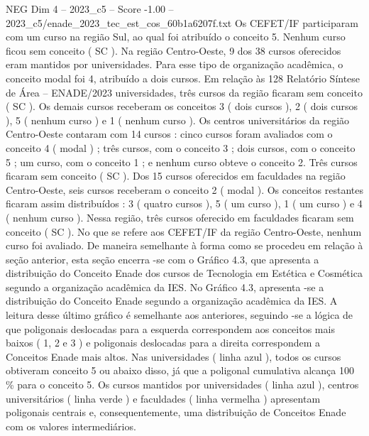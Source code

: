 \begin{textsample}{NEG Dim 4 – 2023\_c5 – Score -1.00 – 2023\_c5/enade\_2023\_tec\_est\_cos\_60b1a6207f.txt}
Os CEFET/IF participaram com um curso na região Sul, ao qual foi atribuído o conceito 5.
Nenhum curso ficou sem conceito ( SC ).
Na região Centro-Oeste, 9 dos 38 cursos oferecidos eram mantidos por universidades.
Para esse tipo de organização acadêmica, o conceito modal foi 4, atribuído a dois cursos.
Em relação às 128 Relatório Síntese de Área – ENADE/2023 universidades, três cursos da região ficaram sem conceito ( SC ).
Os demais cursos receberam os conceitos 3 ( dois cursos ), 2 ( dois cursos ), 5 ( nenhum curso ) e 1 ( nenhum curso ).
Os centros universitários da região Centro-Oeste contaram com 14 cursos : cinco cursos foram avaliados com o conceito 4 ( modal ) ; três cursos, com o conceito 3 ; dois cursos, com o conceito 5 ; um curso, com o conceito 1 ; e nenhum curso obteve o conceito 2.
Três cursos ficaram sem conceito ( SC ).
Dos 15 cursos oferecidos em faculdades na região Centro-Oeste, seis cursos receberam o conceito 2 ( modal ).
Os conceitos restantes ficaram assim distribuídos : 3 ( quatro cursos ), 5 ( um curso ), 1 ( um curso ) e 4 ( nenhum curso ).
Nessa região, três cursos oferecido em faculdades ficaram sem conceito ( SC ).
No que se refere aos CEFET/IF da região Centro-Oeste, nenhum curso foi avaliado.
De maneira semelhante à forma como se procedeu em relação à seção anterior, esta seção encerra -se com o Gráfico 4.3, que apresenta a distribuição do Conceito Enade dos cursos de Tecnologia em Estética e Cosmética segundo a organização acadêmica da IES.
No Gráfico 4.3, apresenta -se a distribuição do Conceito Enade segundo a organização acadêmica da IES.
A leitura desse último gráfico é semelhante aos anteriores, seguindo -se a lógica de que poligonais deslocadas para a esquerda correspondem aos conceitos mais baixos ( 1, 2 e 3 ) e poligonais deslocadas para a direita correspondem a Conceitos Enade mais altos.
Nas universidades ( linha azul ), todos os cursos obtiveram conceito 5 ou abaixo disso, já que a poligonal cumulativa alcança 100 \% para o conceito 5.
Os cursos mantidos por universidades ( linha azul ), centros universitários ( linha verde ) e faculdades ( linha vermelha ) apresentam poligonais centrais e, consequentemente, uma distribuição de Conceitos Enade com os valores intermediários.

\end{textsample}
